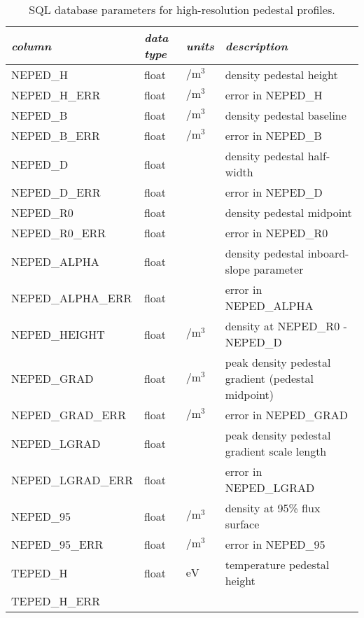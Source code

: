  \begin{longtabu} to 150mm {X[2.348,l]X[1,c]X[1,c]X[4.348,c]}
 \caption{SQL database parameters for high-resolution pedestal profiles.}\label{tab:sql_ped} \\

 \toprule
 \emph{column} &
 \emph{data type} &
 \emph{units} &
 \emph{description}
 \\
 \midrule
 \endfirsthead
 \endhead

 \endfoot
 \bottomrule
 \endlastfoot

 NEPED\_H &
 float &
 $\si{\per\meter\cubed}$ &
 density pedestal height
 \\
 NEPED\_H\_ERR &
 float &
 $\si{\per\meter\cubed}$ &
 error in NEPED\_H
 \\
 NEPED\_B &
 float &
 $\si{\per\meter\cubed}$ &
 density pedestal baseline
 \\
 NEPED\_B\_ERR &
 float &
 $\si{\per\meter\cubed}$ &
 error in NEPED\_B
 \\
 NEPED\_D &
 float &
 &
 density pedestal half-width
 \\
 NEPED\_D\_ERR &
 float &
 &
 error in NEPED\_D
 \\
 NEPED\_R0 &
 float &
 &
 density pedestal midpoint
 \\
 NEPED\_R0\_ERR &
 float &
 &
 error in NEPED\_R0
 \\
 NEPED\_ALPHA &
 float &
 &
 density pedestal inboard-slope parameter
 \\
 NEPED\_ALPHA\_ERR &
 float &
 &
 error in NEPED\_ALPHA
 \\
 NEPED\_HEIGHT &
 float &
 $\si{\per\meter\cubed}$ &
 density at NEPED\_R0 - NEPED\_D
 \\
 NEPED\_GRAD &
 float &
 $\si{\per\meter\cubed}$ &
 peak density pedestal gradient (pedestal midpoint)
 \\
 NEPED\_GRAD\_ERR &
 float &
 $\si{\per\meter\cubed}$ &
 error in NEPED\_GRAD
 \\
 NEPED\_LGRAD &
 float &
 &
 peak density pedestal gradient scale length
 \\
 NEPED\_LGRAD\_ERR &
 float &
 &
 error in NEPED\_LGRAD
 \\
 NEPED\_95 &
 float &
 $\si{\per\meter\cubed}$ &
 density at 95\% flux surface
 \\
 NEPED\_95\_ERR &
 float &
 $\si{\per\meter\cubed}$ &
 error in NEPED\_95
 \\
 TEPED\_H &
 float &
 $\si{\electronvolt}$ &
 temperature pedestal height
 \\
 TEPED\_H\_ERR &

\end{longtabu}
